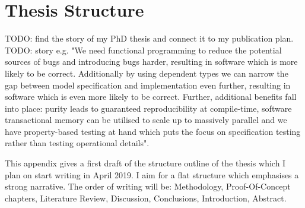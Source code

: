 \chapter{Thesis Structure}
\label{app:thesis_struct}

TODO: find the story of my PhD thesis and connect it to my publication plan. 
TODO: story e.g. "We need functional programming to reduce the potential sources of bugs and introducing bugs harder, resulting in software which is more likely to be correct. Additionally by using dependent types we can narrow the gap between model specification and implementation even further, resulting in software which is even more likely to be correct. Further, additional benefits fall into place: purity leads to guaranteed reproducibility at compile-time, software transactional memory can be utilised to scale up to massively parallel and we have property-based testing at hand which puts the focus on specification testing rather than testing operational details".

This appendix gives a first draft of the structure outline of the thesis which I plan on start writing in April 2019. I aim for a flat structure which emphasises a strong narrative. The order of writing will be: Methodology, Proof-Of-Concept chapters, Literature Review, Discussion, Conclusions, Introduction, Abstract.
%


